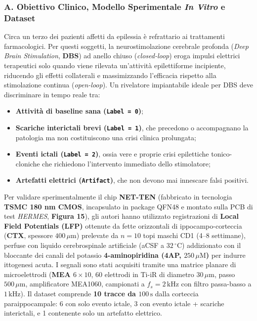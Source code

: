 \documentclass[11pt,a4paper]{article}
\begin{document}
\subsubsection{A. Obiettivo Clinico, Modello Sperimentale \textit{In Vitro} e Dataset}
Circa un terzo dei pazienti affetti da epilessia è refrattario ai trattamenti farmacologici. Per questi soggetti, la neurostimolazione cerebrale profonda (\textit{Deep Brain Stimulation}, \textbf{DBS}) ad anello chiuso (\textit{closed-loop}) eroga impulsi elettrici terapeutici solo quando viene rilevata un'attività epilettiforme incipiente, riducendo gli effetti collaterali e massimizzando l'efficacia rispetto alla stimolazione continua (\textit{open-loop}). Un rivelatore impiantabile ideale per DBS deve discriminare in tempo reale tra:
\begin{itemize}
  \item \textbf{Attività di baseline sana (\texttt{Label = 0})};
  \item \textbf{Scariche interictali brevi (\texttt{Label = 1})}, che precedono o accompagnano la patologia ma non costituiscono una crisi clinica prolungata;
  \item \textbf{Eventi ictali (\texttt{Label = 2})}, ossia vere e proprie crisi epilettiche tonico-cloniche che richiedono l'intervento immediato dello stimolatore;
  \item \textbf{Artefatti elettrici (\texttt{Artifact})}, che non devono mai innescare falsi positivi.
\end{itemize}

Per validare sperimentalmente il chip \textbf{NET-TEN} (fabbricato in tecnologia \textbf{TSMC 180 nm CMOS}, incapsulato in package QFN48 e montato sulla PCB di test \textit{HERMES}, \textbf{Figura 15}), gli autori hanno utilizzato registrazioni di \textbf{Local Field Potentials (LFP)} ottenute da fette orizzontali di ippocampo-corteccia (\textbf{CTX}, spessore $400\,\mu\text{m}$) prelevate da $n = 10$ topi maschi CD1 (4--8 settimane), perfuse con liquido cerebrospinale artificiale (aCSF a $32\,^\circ\text{C}$) addizionato con il bloccante dei canali del potassio \textbf{4-aminopiridina (4AP, $250\,\mu\text{M}$)} per indurre ittogenesi acuta. I segnali sono stati acquisiti tramite una matrice planare di microelettrodi (\textbf{MEA $6 \times 10$}, 60 elettrodi in Ti-iR di diametro $30\,\mu\text{m}$, passo $500\,\mu\text{m}$, amplificatore MEA1060, campionati a $f_s = 2\,\text{kHz}$ con filtro passa-basso a $1\,\text{kHz}$). Il dataset comprende \textbf{10 tracce da $100\,\text{s}$} dalla corteccia paraippocampale: 6 con solo evento ictale, 3 con evento ictale + scariche interictali, e 1 contenente solo un artefatto elettrico.
\end{document}
